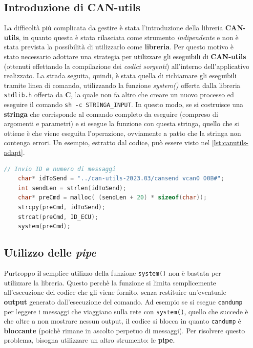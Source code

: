 \subsection{Introduzione di CAN-utils}
La difficoltà più complicata da gestire è stata l'introduzione della libreria \textbf{CAN-utils}, in quanto questa è stata rilasciata come strumento \emph{indipendente} e non è stata prevista la possibilità di utilizzarlo come \textbf{libreria}. Per questo motivo è stato necessario adottare una strategia per utilizzare gli eseguibili di \textbf{CAN-utils} (ottenuti effettando la compilazione dei \emph{codici sorgenti}) all'interno dell'applicativo realizzato. La strada seguita, quindi, è stata quella di richiamare gli eseguibili tramite linea di comando, utilizzando la funzione \emph{system()} offerta dalla libreria \texttt{stdlib.h} offerta da \textbf{C}, la quale non fa altro che creare un nuovo processo ed eseguire il comando \texttt{sh -c STRINGA\_INPUT}. In questo modo, se si costruisce una \textbf{stringa} che corrisponde al comando completo da eseguire (compreso di argomenti e parametri) e si esegue la funzione con questa stringa, quello che si ottiene è che viene eseguita l'operazione, ovviamente a patto che la stringa non contenga errori. Un esempio, estratto dal codice, può essere visto nel \autoref{lst:canutils-adapt}.

\begin{lstlisting}[language=C, caption=Utilizzo di CAN-utils tramite linea di comando, label=lst:canutils-adapt]
    // Invio ID e numero di messaggi
    char* idToSend = "../can-utils-2023.03/cansend vcan0 00B#";
    int sendLen = strlen(idToSend);
    char* preCmd = malloc( (sendLen + 20) * sizeof(char));
    strcpy(preCmd, idToSend);
    strcat(preCmd, ID_ECU);
    system(preCmd);
\end{lstlisting}

\subsection{Utilizzo delle \emph{pipe}}
Purtroppo il semplice utilizzo della funzione \texttt{system()} non è bastata per utilizzare la libreria. Questo perchè la funzione si limita semplicemente all'esecuzione del codice che gli viene fornito, senza restituire un'eventuale \textbf{output} generato dall'esecuzione del comando. Ad esempio se si esegue \texttt{candump} per leggere i messaggi che viaggiano sulla rete con \texttt{system()}, quello che succede è che oltre a non mostrare nessun output, il codice si blocca in quanto \texttt{candump} è \textbf{bloccante} (poichè rimane in ascolto perpetuo di messaggi). Per risolvere questo problema, bisogna utilizzare un altro strumento: le \textbf{pipe}.

